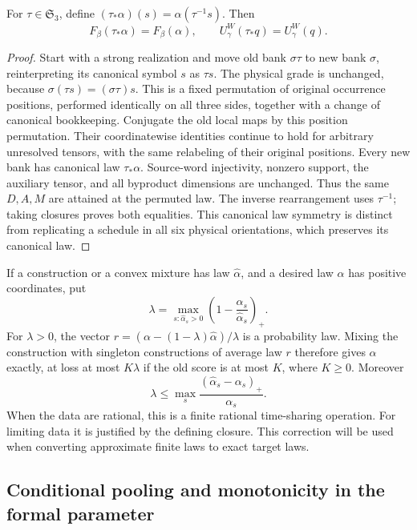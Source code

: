 \begin{lemma}
\label{val:canonical-symmetry}
For $\tau\in\mathfrak S_3$, define
$(\tau_*\alpha)(s)=\alpha(\tau^{-1}s)$.  Then
\[
 F_\beta(\tau_*\alpha)=F_\beta(\alpha),\qquad
 U^W_\gamma(\tau_*q)=U^W_\gamma(q).
\]
\end{lemma}

\begin{proof}
Start with a strong realization and move old bank $\sigma\tau$ to new bank
$\sigma$, reinterpreting its canonical symbol $s$ as $\tau s$.  The physical
grade is unchanged, because $\sigma(\tau s)=(\sigma\tau)s$.  This is a
fixed permutation of original occurrence positions, performed identically
on all three sides, together with a change of canonical bookkeeping.
Conjugate the old local maps by this position permutation.  Their
coordinatewise identities continue to hold for arbitrary unresolved tensors,
with the same relabeling of their original positions.  Every new bank has
canonical law $\tau_*\alpha$.  Source-word injectivity, nonzero support,
the auxiliary tensor, and all byproduct dimensions are unchanged.  Thus the
same $D,A,M$ are attained at the permuted law.  The inverse rearrangement
uses $\tau^{-1}$; taking closures proves both equalities.  This canonical
law symmetry is distinct from replicating a schedule in all six physical
orientations, which preserves its canonical law.
\end{proof}

\begin{remark}
\label{val:dilution}
If a construction or a convex mixture has law $\widehat\alpha$, and a desired
law $\alpha$ has positive coordinates, put
\[
 \lambda=\max_{s:\widehat\alpha_s>0}
 \left(1-\frac{\alpha_s}{\widehat\alpha_s}\right)_+.
\]
For $\lambda>0$, the vector
$r=(\alpha-(1-\lambda)\widehat\alpha)/\lambda$ is a probability law.
Mixing the construction with singleton constructions of average law $r$
therefore gives $\alpha$ exactly, at loss at most $K\lambda$ if the old score
is at most $K$, where $K\ge0$.  Moreover
\[
 \lambda\le
 \max_s\frac{(\widehat\alpha_s-\alpha_s)_+}{\alpha_s}.
\]
When the data are rational, this is a finite rational time-sharing operation.
For limiting data it is justified by the defining closure.  This correction
will be used when converting approximate finite laws to exact target laws.
\end{remark}

\subsection{Conditional pooling and monotonicity in the formal parameter}
\label{val:pooling}

